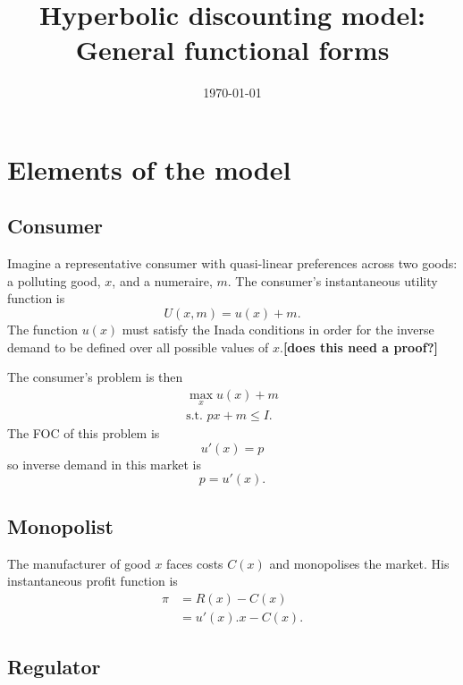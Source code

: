 \documentclass{amsart}
\title{Hyperbolic discounting model: \\General functional forms} \date{\today}
\begin{document}
\maketitle

\section{Elements of the model}
\label{sec:elements-model}

\subsection{Consumer}
\label{sec:consumer}

Imagine a representative consumer with quasi-linear preferences across
two goods: a polluting good, $x$, and a numeraire, $m$. The consumer's
instantaneous utility function is
\begin{equation}
  \label{eq:1}
  U(x,m) = u(x) + m.
\end{equation}
The function $u(x)$ must satisfy the Inada conditions in order for the
inverse demand to be defined over all possible values of
$x$.\textbf{[does this need a proof?]}

The consumer's problem is then
\begin{gather}
  \label{eq:2}
  \max_x u(x) + m \\
  \mbox{s.t. } px + m \leq I.
\end{gather}
The FOC of this problem is
\begin{equation}
  \label{eq:3}
  u'(x) = p
\end{equation}
so inverse demand in this market is
\begin{equation}
  \label{eq:4}
  p=u'(x).
\end{equation}

\subsection{Monopolist}
\label{sec:monopolist}

The manufacturer of good $x$ faces costs $C(x)$ and monopolises the
market. His instantaneous profit function is
\begin{align}
  \label{eq:5}
  \pi &= R(x) - C(x) \\
  &= u'(x).x - C(x).
\end{align}


\subsection{Regulator}
\label{sec:regulator}
\end{document}

